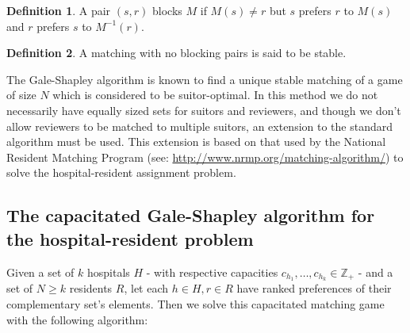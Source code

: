 \documentclass{article}
\theoremstyle{definition}
\newtheorem{definition}{Definition}[section]
\begin{document}
\begin{definition}\label{def:blocking-pair}	
	A pair $(s,r)$ blocks $M$ if $M(s) \ne r$ but $s$ prefers $r$ to $M(s)$ and $r$ prefers $s$ to $M^{-1}(r)$.
\end{definition}

\begin{definition}\label{def:stable-matching}
	A matching with no blocking pairs is said to be stable.
\end{definition}

The Gale-Shapley algorithm is known to find a unique stable matching of a game of size $N$ which is considered to be suitor-optimal. In this method we do not necessarily have equally sized sets for suitors and reviewers, and though we don't allow reviewers to be matched to multiple suitors, an extension to the standard algorithm must be used. This extension is based on that used by the National Resident Matching Program (see: \url{http://www.nrmp.org/matching-algorithm/}) to solve the hospital-resident assignment problem.  \\

\subsection{The capacitated Gale-Shapley algorithm for the hospital-resident problem}\label{subsection:capacitated-galeshapley}

Given a set of $k$ hospitals $H$ - with respective capacities $c_{h_1}, \ldots, c_{h_k} \in \mathbb{Z}_+$ - and a set of $N \ge k$ residents $R$, let each $h \in H, r \in R$ have ranked preferences of their complementary set's elements. Then we solve this capacitated matching game with the following algorithm:
\end{document}
